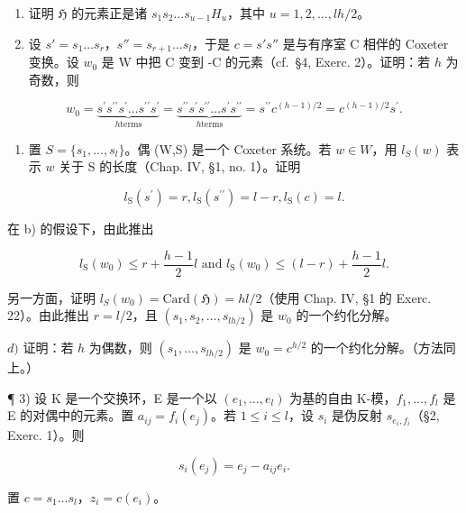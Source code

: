 \begin{enumerate}
\def\labelenumi{\alph{enumi})}
\item
  证明 \(\mathfrak{H}\) 的元素正是诸 \(s_1 s_2 \ldots s_{u-1} H_u\)，其中 \(u = 1, 2, \ldots, lh/2\)。
\item
  设 \(s' = s_1 \ldots s_r\)，\(s'' = s_{r+1} \ldots s_l\)，于是 \(c = s's''\) 是与有序室 C 相伴的 Coxeter 变换。设 \(w_0\) 是 W 中把 C 变到 -C 的元素（cf.~§4, Exerc. 2）。证明：若 \(h\) 为奇数，则
\end{enumerate}

\[
w _ {0} = \underbrace {s ^ {\prime} s ^ {\prime \prime} s ^ {\prime} \ldots s ^ {\prime \prime} s ^ {\prime}} _ {h \text {terms}} = \underbrace {s ^ {\prime \prime} s ^ {\prime} s ^ {\prime \prime} \ldots s ^ {\prime} s ^ {\prime \prime}} _ {h \text {terms}} = s ^ {\prime \prime} c ^ {(h - 1) / 2} = c ^ {(h - 1) / 2} s ^ {\prime}.
\]

\begin{enumerate}
\def\labelenumi{\alph{enumi})}
\setcounter{enumi}{2}
\tightlist
\item
  置 \(S = \{s_1, \ldots, s_l\}\)。偶 (W,S) 是一个 Coxeter 系统。若 \(w \in W\)，用 \(l_S(w)\) 表示 \(w\) 关于 S 的长度（Chap. IV, §1, no. 1）。证明
\end{enumerate}

\[
l _ {\mathrm{S}} (s ^ {\prime}) = r, l _ {\mathrm{S}} (s ^ {\prime \prime}) = l - r, l _ {\mathrm{S}} (c) = l.
\]

在 b) 的假设下，由此推出

\[
l _ {\mathrm{S}} (w _ {0}) \leqslant r + \frac {h - 1}{2} l \text { and } l _ {\mathrm{S}} (w _ {0}) \leqslant (l - r) + \frac {h - 1}{2} l.
\]

另一方面，证明 \(l_{S}(w_0) = \mathrm{Card}(\mathfrak{H}) = hl / 2\)（使用 Chap. IV, §1 的 Exerc. 22）。由此推出 \(r = l / 2\)，且 \((s_1, s_2, \ldots, s_{lh / 2})\) 是 \(w_0\) 的一个约化分解。

\(d)\) 证明：若 \(h\) 为偶数，则 \((s_1,\ldots ,s_{lh / 2})\) 是 \(w_{0} = c^{h / 2}\) 的一个约化分解。（方法同上。）

¶ 3) 设 K 是一个交换环，E 是一个以 \((e_1, \ldots, e_l)\) 为基的自由 K-模，\(f_1, \ldots, f_l\) 是 E 的对偶中的元素。置 \(a_{ij} = f_i(e_j)\)。若 \(1 \leqslant i \leqslant l\)，设 \(s_i\) 是伪反射 \(s_{e_i, f_i}\)（\S 2, Exerc. 1）。则

\[
s _ {i} (e _ {j}) = e _ {j} - a _ {i j} e _ {i}.
\]

置 \(c = s_1 \ldots s_l\)，\(z_i = c(e_i)\)。

